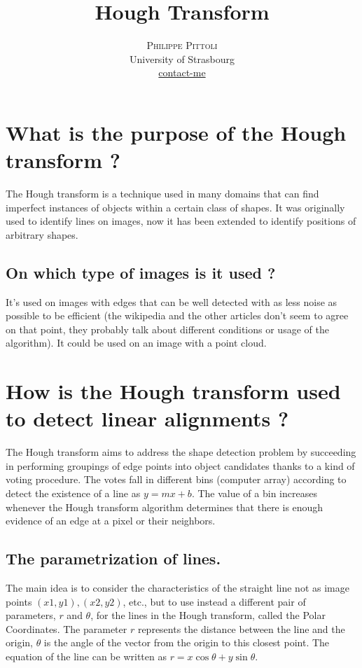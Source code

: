 \documentclass[twoside]{article}
\title{\vspace{-15mm}\fontsize{24pt}{10pt}\selectfont\textbf{Hough Transform}} %
\author{
\large
\textsc{Philippe Pittoli}\\[2mm] %
\normalsize University of Strasbourg \\ %
\normalsize \href{mailto:philippe.pittoli@etu.unistra.fr}{contact-me} %
\vspace{-5mm}
}
\date{}
\begin{document}
\maketitle %

\thispagestyle{fancy} %


\section{What is the purpose of the Hough transform ?}
The Hough transform is a technique used in many domains that can find imperfect instances of objects within a certain class of shapes.
It was originally used to identify lines on images, now it has been extended to identify positions of arbitrary shapes.

\subsection{On which type of images is it used ?}
It's used on images with edges that can be well detected with as less noise as possible to be efficient (the wikipedia and the other articles don't seem to agree on that point, they probably talk about different conditions or usage of the algorithm).
It could be used on an image with a point cloud.

\section{How is the Hough transform used to detect linear alignments ?}
The Hough transform aims to address the shape detection problem by succeeding in performing groupings of edge points into object candidates thanks to a kind of voting procedure.
The votes fall in different bins (computer array) according to detect the existence of a line as $y = mx + b$.
The value of a bin increases whenever the Hough transform algorithm determines that there is enough evidence of an edge at a pixel or their neighbors.

\subsection{The parametrization of lines.}
The main idea is to consider the characteristics of the straight line not as image points $(x1, y1), (x2, y2)$, etc.,
but to use instead a different pair of parameters, $r$ and $\theta$, for the lines in the Hough transform, called the Polar Coordinates.
The parameter $r$ represents the distance between the line and the origin, $\theta$ is the angle of the vector from the origin to this closest point.
The equation of the line can be written as $r = x \cos \theta+y\sin \theta$.
\end{document}
